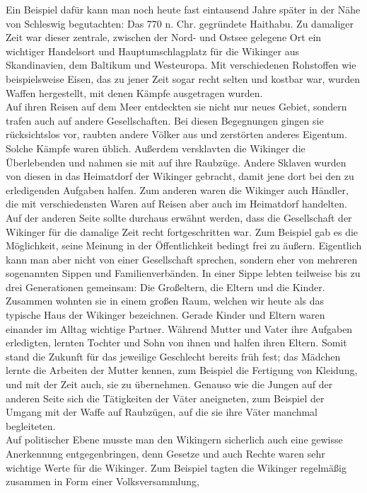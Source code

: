 \documentclass[12pt,a4paper,ngerman,openany]{book}
\begin{document}
Ein Beispiel dafür kann man noch heute fast eintausend Jahre später in der Nähe von Schleswig begutachten: Das 770 n. Chr. gegründete Haithabu. Zu damaliger Zeit war dieser zentrale,
zwischen der Nord- und Ostsee gelegene Ort ein wichtiger Handelsort und Hauptumschlagplatz für die Wikinger aus Skandinavien, dem Baltikum und Westeuropa. Mit verschiedenen Rohstoffen wie beispielsweise Eisen,
das zu jener Zeit sogar recht selten und kostbar war, wurden Waffen hergestellt, mit denen Kämpfe ausgetragen wurden.\\ 
Auf ihren Reisen auf dem Meer entdeckten sie nicht nur neues Gebiet, sondern trafen auch auf andere Gesellschaften. Bei diesen Begegnungen gingen sie rücksichtslos vor, raubten andere Völker aus und zerstörten anderes Eigentum.
Solche Kämpfe waren üblich. Außerdem versklavten die Wikinger die Überlebenden und nahmen sie mit auf ihre Raubzüge. Andere Sklaven wurden von diesen in das Heimatdorf der Wikinger gebracht, damit jene dort bei den zu erledigenden Aufgaben halfen.
Zum anderen waren die Wikinger auch Händler, die mit verschiedensten Waren auf Reisen aber auch im Heimatdorf handelten.\\
Auf der anderen Seite sollte durchaus erwähnt werden, dass die Gesellschaft der Wikinger für die damalige Zeit recht fortgeschritten war. Zum Beispiel gab es die Möglichkeit, seine Meinung in der Öffentlichkeit bedingt frei zu äußern.
Eigentlich kann man aber nicht von einer Gesellschaft sprechen, sondern eher von mehreren sogenannten Sippen und Familienverbänden. In einer Sippe lebten teilweise bis zu drei Generationen gemeinsam: Die Großeltern, die Eltern und die Kinder.
Zusammen wohnten sie in einem großen Raum, welchen wir heute als das typische Haus der Wikinger bezeichnen. Gerade Kinder und Eltern waren einander im Alltag wichtige Partner. Während Mutter und Vater ihre Aufgaben erledigten,
lernten Tochter und Sohn von ihnen und halfen ihren Eltern. Somit stand die Zukunft für das jeweilige Geschlecht bereits früh fest; das Mädchen lernte die Arbeiten der Mutter kennen, zum Beispiel die Fertigung von Kleidung, und mit der Zeit auch, sie zu übernehmen.
Genauso wie die Jungen auf der anderen Seite sich die Tätigkeiten der Väter aneigneten, zum Beispiel der Umgang mit der Waffe auf Raubzügen, auf die sie ihre Väter manchmal begleiteten.\\
Auf politischer Ebene musste man den Wikingern sicherlich auch eine gewisse Anerkennung entgegenbringen, denn Gesetze und auch Rechte waren sehr wichtige Werte für die Wikinger. Zum Beispiel tagten die Wikinger regelmäßig zusammen in Form einer Volksversammlung,
\end{document}
